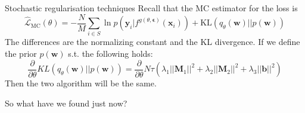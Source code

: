 \documentclass{beamer}
\begin{document}
\begin{frame}[allowframebreaks]{Stochastic regularisation techniques}
Recall that the MC estimator for the loss is 
$$\hat{\mathcal{L}}_{\text{MC}} (\theta)  = - \frac{N}{M}\sum_{i\in S}  \ln p(\mathbf{y}_i | f^{g(\theta, \bm{\epsilon})} (\mathbf{x}_i)) + \text{KL}(q_\theta(\mathbf{w}) || p(\mathbf{w}))$$
The differences are the normalizing constant and the KL divergence.
If we define the prior $p(\mathbf{w})$ s.t. the following holds:
$$\frac{\partial}{\partial \theta} KL(q_\theta (\mathbf{w}) || p(\mathbf{w})) = \frac{\partial}{\partial \theta } N \tau (\lambda_1 || \mathbf{M}_1||^2 + \lambda_2 || \mathbf{M}_2||^2 + \lambda_3 ||\mathbf{b}||^2)$$
Then the two algorithm will be the same.

\framebreak 

So what have we found just now?



\end{frame}
\end{document}
